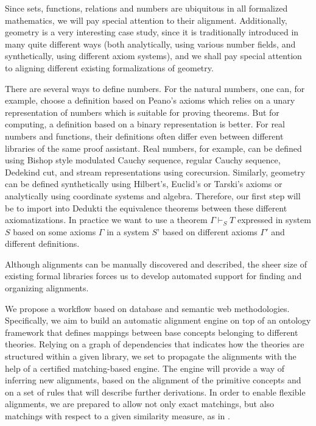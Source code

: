 Since sets, functions, relations and numbers are ubiquitous in all
formalized mathematics, we will pay special attention to their
alignment. Additionally, geometry is a very interesting case study,
since it is traditionally introduced in many quite different ways
(both analytically, using various number fields, and synthetically,
using different axiom systems), and we shall pay special attention
to aligning different existing formalizations of geometry.

There are several ways to define numbers. For the natural numbers,
one can, for example, choose a definition based on Peano’s axioms which
relies on a unary representation of numbers which is suitable for
proving theorems. But for computing, a definition based on a binary
representation is better. For real numbers and functions, their
definitions often differ even between different libraries of the same
proof assistant.  Real numbers, for example, can be defined using 
Bishop style modulated Cauchy sequence, regular Cauchy sequence,
Dedekind cut, and stream representations using corecursion.
Similarly, geometry can be defined synthetically using Hilbert’s,
Euclid’s or Tarski’s axioms or analytically using coordinate systems and
algebra.  Therefore, our first step will be to import into Dedukti the
equivalence theorems between these different axiomatizations. In
practice we want to use a theorem $\Gamma \vdash_S T$ expressed in
system $S$ based on some axioms $\Gamma$ in a system $S’$ based on
different axioms $\Gamma'$ and different definitions.

Although alignments can be manually discovered and described, the
sheer size of existing formal libraries forces us to develop automated
support for finding and organizing alignments.


We propose a workflow based on database and semantic web
methodologies. Specifically, we aim to build an automatic alignment
engine on top of an ontology framework that defines mappings between
base concepts belonging to different theories. Relying on a graph of
dependencies that indicates how the theories are structured within a
given library, we set to propagate the alignments with the help of a
certified matching-based engine. The engine will provide a way of
inferring new alignments, based on the alignment of the primitive
concepts and on a set of rules that will describe further
derivations. In order to enable flexible alignments, we are prepared to allow
not only exact matchings, but also matchings with respect to a given
similarity measure, as in \cite{???}.

